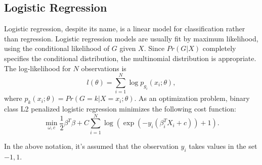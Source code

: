 \documentclass[10pt,journal,compsoc]{IEEEtran}
\begin{document}
\subsection{Logistic Regression}
\label{subsec:logistic_regression}
Logistic regression, despite its name, is a linear model for classification rather than regression. Logistic regression models are usually fit by maximum likelihood, using the conditional likelihood of $G$ given $X$. Since $Pr(G|X)$ completely specifies the conditional distribution, the multinomial distribution is appropriate. The log-likelihood for $N$ observations is
\begin{equation}
  l(\theta) = \sum_{i=1}^N\log p_{g_i}(x_i;\theta),
\end{equation}
where $p_k(x_i;\theta) = Pr(G=k|X=x_i;\theta)$. As an optimization problem, binary class L2 penalized logistic regression minimizes the following cost function:
\begin{equation}
  \min_{\omega, c} \frac{1}{2}\beta^T\beta + C\sum_{i=1}^N\log(\exp(-y_i(\beta_i^TX_i + c)) + 1).
\end{equation}

In the above notation, it's assumed that the observation $y_i$ takes values in the set $-1, 1$.
\end{document}
